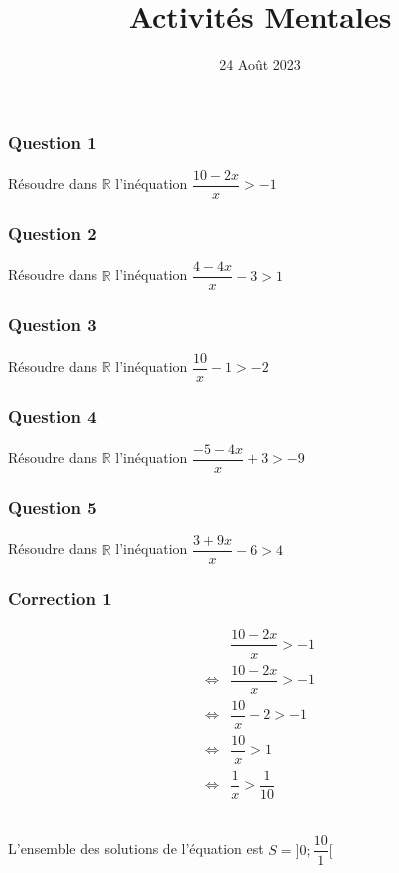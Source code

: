 \documentclass[15pt, mathserif]{beamer}
\title{Activités Mentales}
\date{24 Août 2023}
\newcommand{\R}{\mathbb{R}}			%
\begin{document}
\begin{frame}
    \titlepage
\end{frame}

\begin{frame} 
	\frametitle{Question 1}
Résoudre dans $\R$ l'inéquation $\dfrac{10-2x}{x}>-1$\end{frame}


\begin{frame} 
	\frametitle{Question 2}
Résoudre dans $\R$ l'inéquation $\dfrac{4-4x}{x}-3>1$\end{frame}


\begin{frame} 
	\frametitle{Question 3}
Résoudre dans $\R$ l'inéquation $\dfrac{10}{x}-1>-2$\end{frame}


\begin{frame} 
	\frametitle{Question 4}
Résoudre dans $\R$ l'inéquation $\dfrac{-5-4x}{x}+3>-9$\end{frame}


\begin{frame} 
	\frametitle{Question 5}
Résoudre dans $\R$ l'inéquation $\dfrac{3+9x}{x}-6>4$\end{frame}


\begin{frame}
\vspace{-10mm}
	\frametitle{Correction 1}
 \begin{multicols}{2} 
 
 \begin{align*} & \dfrac{10-2x}{x}>-1\\ 
 \Leftrightarrow & \dfrac{10-2x}{x}>-1\\ 
 \Leftrightarrow & \dfrac{10}{x}-2>-1\\ 
 \Leftrightarrow & \dfrac{10}{x}>1\\ 
 \Leftrightarrow & \dfrac{1}{x}>\dfrac{1}{10} 
 \end{align*}
 
 \\ 
 L'ensemble des solutions de l'équation est $S=]0;\dfrac{10}{1}[$
 \end{multicols} 
 \end{frame}
\end{document}
